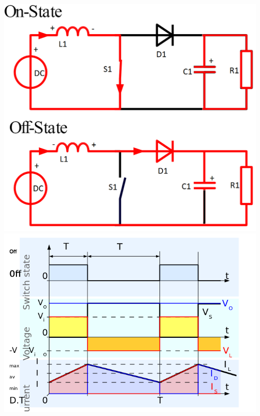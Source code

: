 \begin{minipage}{0.25\linewidth}
    \includegraphics[width=\linewidth]{images/BoostOnOff}
    \includegraphics[width=\linewidth]{images/BoostSwitch}
\end{minipage}
